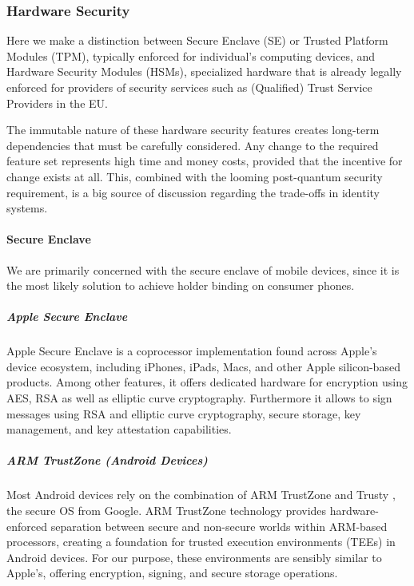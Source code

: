 
\subsubsection{Hardware Security}

Here we make a distinction between Secure Enclave (SE) or Trusted Platform Modules (TPM), typically enforced for individual's computing devices, and Hardware Security Modules (HSMs), specialized hardware that is already legally enforced for providers of security services such as (Qualified) Trust Service Providers in the EU.

The immutable nature of these hardware security features creates long-term dependencies that must be carefully considered. Any change to the required feature set represents high time and money costs, provided that the incentive for change exists at all. This, combined with the looming post-quantum security requirement, is a big source of discussion regarding the trade-offs in identity systems.


\paragraph{Secure Enclave} We are primarily concerned with the secure enclave of mobile devices, since it is the most likely solution to achieve holder binding on consumer phones.

\subparagraph{Apple Secure Enclave}

Apple Secure Enclave \cite{apple-secure-enclaves} is a coprocessor implementation found across Apple's device ecosystem, including iPhones, iPads, Macs, and other Apple silicon-based products. Among other features, it offers dedicated hardware for encryption using AES, RSA as well as elliptic curve cryptography.
Furthermore it allows to sign messages using RSA and elliptic curve cryptography, secure storage, key management, and key attestation capabilities.

\subparagraph{ARM TrustZone (Android Devices)}

Most Android devices rely on the combination of ARM TrustZone \cite{arm-trustzone} and Trusty \cite{trusty}, the secure OS from Google. ARM TrustZone technology provides hardware-enforced separation between secure and non-secure worlds within ARM-based processors, creating a foundation for trusted execution environments (TEEs) in Android devices. For our purpose, these environments are sensibly similar to Apple's, offering encryption, signing, and secure storage operations.



